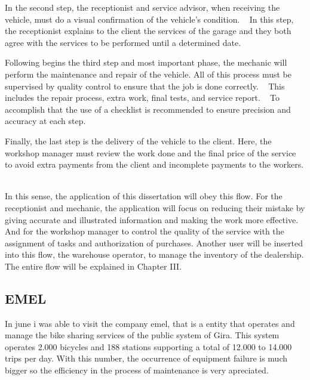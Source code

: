 In the second step, the receptionist and service advisor, when receiving the vehicle, must do a visual confirmation of the vehicle's condition. ~\cite{Setting_the_after_sale_process}
In this step, the receptionist explains to the client the services of the garage and they both agree with the services to be performed until a determined date. ~\cite{Setting_the_after_sale_process}

Following begins the third step and most important phase, the mechanic will perform the maintenance and repair of the vehicle. 
All of this process must be supervised by quality control to ensure that the job is done correctly. ~\cite{Setting_the_after_sale_process}
This includes the repair process, extra work, final tests, and service report. ~\cite{Setting_the_after_sale_process}
To accomplish that the use of a checklist is recommended to ensure precision and accuracy at each step. ~\cite{Setting_the_after_sale_process}

Finally, the last step is the delivery of the vehicle to the client. 
Here, the workshop manager must review the work done and the final price of the service to avoid extra payments from the client and incomplete payments to the workers. ~\cite{Setting_the_after_sale_process}

In this sense, the application of this dissertation will obey this flow.
For the receptionist and mechanic, the application will focus on reducing their mistake by giving accurate and illustrated information and making the work more effective.
And for the workshop manager to control the quality of the service with the assignment of tasks and authorization of purchases. 
Another user will be inserted into this flow, the warehouse operator, to manage the inventory of the dealership. 
The entire flow will be explained in Chapter III. 


\subsection{EMEL}
In june  i was able to visit the company \ac{emel}, that is a entity that operates and manage the bike sharing services of the public system of Gira.
This system operates 2.000 bicycles and 188 stations supporting a total of 12.000 to 14.000 trips per day.
With this number, the occurrence of equipment failure is much bigger so the efficiency in the process of maintenance is very apreciated.

